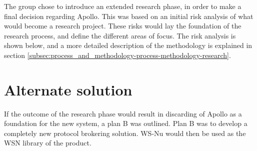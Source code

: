 The group chose to introduce an extended research phase, in order to make a final decision regarding Apollo. This was based on an initial risk analysis of what would become a research project. These risks would lay the foundation of the research process, and define the different areas of focus. The risk analysis is shown below, and a more detailed description of the methodology is explained in section \ref{subsec:process_and_methodology-process-methodology-research}.

\begin{table}[ht!]
\centering
{}
\caption{Risk analysis for building the system based on Apollo}
\label{tab:risk_analysis_apollo}
\end{table}

\section{Alternate solution}
\label{sec:prestudies-alternate_solution}

If the outcome of the research phase would result in discarding of Apollo as a foundation for the new system, a plan B was outlined. Plan B was to develop a completely new protocol brokering solution. WS-Nu would then be used as the WSN library of the product. 

